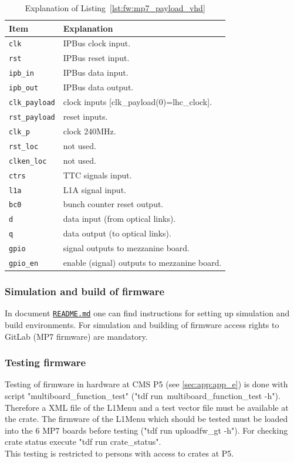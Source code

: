\medskip
\begin{table}
\footnotesize
\caption{Explanation of Listing~\ref{lst:fw:mp7_payload_vhd}}
\vspace{5mm}
\centering
\begin{tabular}{l p{}}
\toprule
{Item} & {Explanation}\\
\midrule
\verb|clk| & IPBus clock input.\\
\verb|rst| & IPBus reset input.\\
\verb|ipb_in| & IPBus data input.\\
\verb|ipb_out| & IPBus data output.\\
\verb|clk_payload| & clock inputs [clk\_payload(0)=lhc\_clock].\\
\verb|rst_payload| & reset inputs.\\
\verb|clk_p| & clock 240MHz.\\
\verb|rst_loc| & not used.\\
\verb|clken_loc| & not used.\\
\verb|ctrs| & TTC signals input.\\
\verb|l1a| & L1A signal input.\\
\verb|bc0| & bunch counter reset output.\\
\verb|d| & data input (from optical links).\\
\verb|q| & data output (to optical links).\\
\verb|gpio| & signal outputs to mezzanine board.\\
\verb|gpio_en| & enable (signal) outputs to mezzanine board.\\
\bottomrule
\end{tabular}
\label{tab:gtl:explanation_mp7_payload_vhd}
\end{table}

\clearpage

\subsubsection{Simulation and build of firmware}
\label{sec:fw:sim_build_firmware}

In document \href{\gitbranch/README.md}{\texttt{\textquotesingle README.md\textquotesingle }} one can find instructions for setting up simulation and build environments. For simulation and building of firmware access rights to GitLab (MP7 firmware) are mandatory.

\subsubsection{Testing firmware}
\label{sec:fw:testing_firmware}

Testing of firmware in hardware at CMS P5 (see \ref{sec:app:app_e}) is done with script "multiboard\_function\_test" ("tdf run\ multiboard\_function\_test -h"). Therefore a XML file of the L1Menu and a test vector file must be available at the crate. The firmware of the L1Menu which should be tested must be loaded into the 6 MP7 boards before testing ("tdf run uploadfw\_gt -h"). For checking crate status execute "tdf run crate\_status".\\
This testing is restricted to persons with access to \ugt crates at P5.

\clearpage
